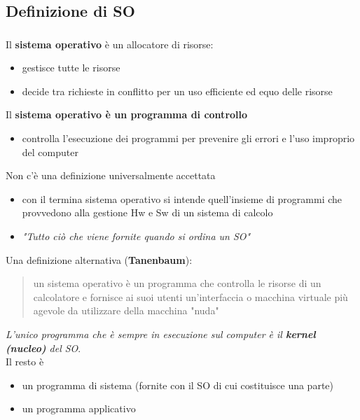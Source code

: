 \documentclass{beamer}
\newenvironment{mainframe}{
	\begin{frame}
		\frametitle{\insertsubsection}
		\framesubtitle{\insertsection}
	}{
	\end{frame}
}
\begin{document}
\subsection{Definizione di SO}
\begin{mainframe}
	Il \textbf{sistema operativo} è un allocatore di risorse:
	\begin{itemize}
		\item gestisce tutte le risorse
		\item decide tra richieste in conflitto per un uso efficiente ed equo delle risorse
	\end{itemize}
	Il \textbf{sistema operativo è un programma di controllo}
	\begin{itemize}
		\item controlla l'esecuzione dei programmi per prevenire gli errori e l'uso improprio del computer
	\end{itemize}
\end{mainframe}
\begin{frame}
	Non c'è una definizione universalmente accettata
	\begin{itemize}
		\item con il termina sistema operativo si intende quell'insieme di programmi che provvedono alla gestione Hw e Sw di un sistema di calcolo
		\item \textit{"Tutto ciò che viene fornite quando si ordina un SO"}
	\end{itemize}
	Una definizione alternativa (\textbf{Tanenbaum}):
	\begin{quotation}
		un sistema operativo è un programma che controlla le risorse di un calcolatore e fornisce ai suoi utenti un'interfaccia o macchina virtuale più agevole da utilizzare della macchina "nuda"
	\end{quotation}
	\textit{L'unico programma che è sempre in esecuzione sul computer è il \textbf{kernel (nucleo)} del SO}.\\
	Il resto è
	\begin{itemize}
		\item un programma di sistema (fornite con il SO di cui costituisce una parte)
		\item un programma applicativo
	\end{itemize} 
\end{frame}
\end{document}

